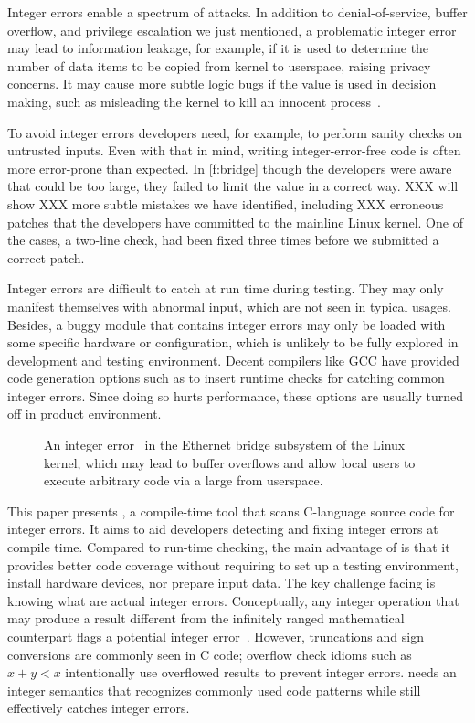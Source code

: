 Integer errors enable a spectrum of attacks.  In addition to
denial-of-service, buffer overflow, and privilege escalation we
just mentioned, a problematic integer error may lead to information
leakage, for example, if it is used to determine the number of data
items to be copied from kernel to userspace, raising privacy concerns.
It may cause more subtle logic bugs if the value is used in decision
making, such as misleading the kernel to kill an innocent
process~\cite[CVE-2011-4097]{cve}.


To avoid integer errors developers need, for example, to perform
sanity checks on untrusted inputs.  Even with that in mind, writing
integer-error-free code is often more error-prone than expected.
In \autoref{f:bridge} though the developers were aware that 
could be too large, they failed to limit the value in a correct
way.  XXX will show XXX more subtle mistakes we have identified,
including XXX erroneous patches that the developers have committed
to the mainline Linux kernel.  One of the cases, a two-line check,
had been fixed three times before we submitted a correct patch.

Integer errors are difficult to catch at run time during testing.
They may only manifest themselves with abnormal input, which are
not seen in typical usages.  Besides, a buggy module that contains
integer errors may only be loaded with some specific hardware or
configuration, which is unlikely to be fully explored in development
and testing environment.  Decent compilers like GCC have provided
code generation options such as  to insert runtime
checks for catching common integer errors.  Since doing so hurts
performance, these options are usually turned off in product
environment.
\fi

\begin{figure}[t]
\centering

\vspace{-1em}
\caption{An integer error~\cite[CVE-2006-5751]{cve} in the Ethernet
bridge subsystem of the Linux kernel, which may lead to buffer
overflows and allow local users to execute arbitrary code via a
large  from userspace.}
\label{f:bridge}
\end{figure}

This paper presents \sys, a compile-time tool that scans C-language
source code for integer errors.
It aims to aid developers detecting
and fixing integer errors at compile time.  Compared to run-time
checking, the main advantage of \sys is that it provides better
code coverage without requiring to set up a testing environment,
install hardware devices, nor prepare input data.
\fi
The key challenge facing \sys is knowing what are actual integer
errors.  Conceptually, any integer operation that may produce a
result different from the infinitely ranged mathematical counterpart
flags a potential integer error~\cite{air}.  However, truncations
and sign conversions are commonly seen in C code; overflow check
idioms such as $x + y < x$ intentionally use overflowed results to
prevent integer errors.  \sys needs an integer semantics that
recognizes commonly used code patterns while still effectively
catches integer errors.

